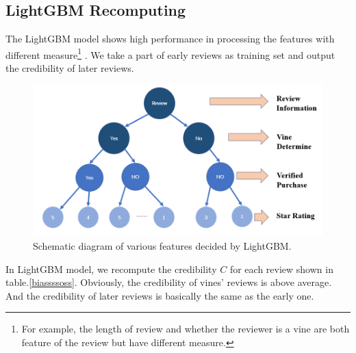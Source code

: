 \documentclass[12pt]{article}%
\begin{document}
\subsection{LightGBM Recomputing}
The LightGBM\cite{lgb,lgb2} model shows high performance in processing the features with different measure\footnote{\quad For example, the length of review and whether the reviewer is a vine are both feature of the review but have different measure.} . We take a part of early reviews as training set and output the credibility of later reviews.


\begin{figure}[H]
	\centering
	\includegraphics[width=.7\textwidth]{shu.png}%
	\caption{Schematic diagram of various features decided by LightGBM.}\label{llsaall}%
\end{figure}

In LightGBM model, we recompute the credibility $C$ for each review shown in table.\ref{biassssoss}. Obviously, the credibility of vines' reviews is above average. And the credibility of later reviews is basically the same as the early one. 
\end{document}
